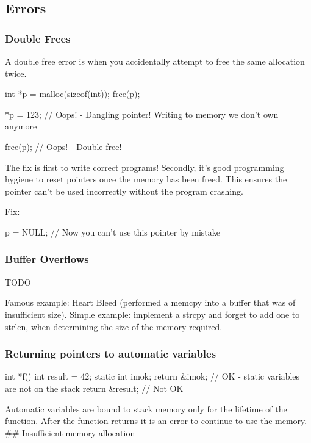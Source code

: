 \subsection{Errors}

\subsubsection{Double Frees}

A double free error is when you accidentally attempt to free the same allocation twice.

\begin{code}[language=C]
int *p = malloc(sizeof(int));
free(p);

*p = 123; // Oops! - Dangling pointer! Writing to memory we don't own anymore

free(p); // Oops! - Double free!
\end{code}

The fix is first to write correct programs! Secondly, it's good programming hygiene to reset pointers once the memory has been freed. This ensures the pointer can't be used incorrectly without the program crashing.

Fix:

\begin{code}[language=C]
p = NULL; // Now you can't use this pointer by mistake
\end{code}

\subsubsection{Buffer Overflows}

TODO

Famous example: Heart Bleed (performed a memcpy into a buffer that was of insufficient size). Simple example: implement a strcpy and forget to add one to strlen, when determining the size of the memory required.

\subsubsection{Returning pointers to automatic variables}

\begin{code}[language=C]
int *f() {
    int result = 42;
    static int imok;
    return &imok; // OK - static variables are not on the stack
    return &result; // Not OK
}
\end{code}

Automatic variables are bound to stack memory only for the lifetime of
the function. After the function returns it is an error to continue to
use the memory. \#\# Insufficient memory allocation

